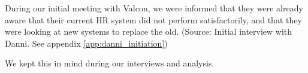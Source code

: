 During our initial meeting with Valcon, we were informed that they were already aware that their current HR system did not perform satisfactorily, and that they were looking at new systems to replace the old. (Source: Initial interview with Danni. See appendix \ref{app:danni_initiation})

We kept this in mind during our interviews and analysis.
